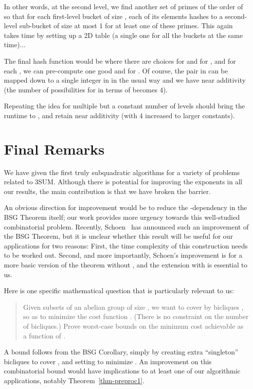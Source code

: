 \documentclass[11pt]{article}
\begin{document}
{{In other words, at the second level, we find another set of 
primes of the order of  so that for each first-level
bucket of size , each of its elements hashes to a
second-level sub-bucket of size at most 1 for at least one of
these primes.  This again takes  time by setting up
a 2D table (a single one for all the buckets at the same time)...

The final hash function would be 
where there are  choices for  and for , and for each ,
we can pre-compute one good  and  for .  Of course, the pair
in  can be mapped down to a single integer in 
in the usual way and we have near additivity (the number of possibilities
for  in terms of  becomes 4).

Repeating the idea for multiple but a constant number of levels should
bring the runtime to , and retain near additivity (with
4 increased to larger constants).

}


\section{Final Remarks}

We have given the first truly subquadratic algorithms for
a variety of problems related to 3SUM\@.
Although there is potential for improving the exponents in
all our results, the main contribution is that we have broken the
barrier.

An obvious direction for improvement would be to reduce the
-dependency in the BSG Theorem itself;
our work provides more urgency towards this well-studied combinatorial
problem.  Recently, Schoen~\cite{Sch14} has announced such an improvement of
the BSG Theorem, but it is unclear whether this result will be useful
for our applications for two reasons: First, the time complexity of
this construction needs to be worked out. Second, and more importantly,
Schoen's improvement is for a more basic version of the theorem without ,
and the extension with  is essential to us.

Here is one specific mathematical question that is particularly relevant to us:
\begin{quote}
Given subsets  of
an abelian group of size , we want to
cover 
by bicliques , so as to minimize the cost function
.  (There is no constraint on the
number of bicliques.)  Prove worst-case bounds on the minimum
cost achievable as a function of .
\end{quote}
A bound  follows from the BSG Corollary, simply by
creating  extra ``singleton'' bicliques
to cover , and setting  to minimize
.  An improvement on this
combinatorial bound would have implications to at
least one of our algorithmic applications, notably
Theorem~\ref{thm-preproc1}.

}
\end{document}
